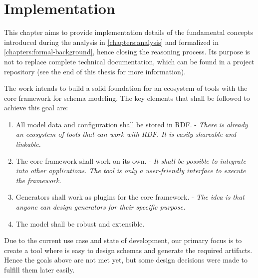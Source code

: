 \chapter{Implementation}\label{chapters:implementation}

This chapter aims to provide implementation details of the fundamental concepts introduced during the analysis in \autoref{chapters:analysis} and formalized in \autoref{chapters:formal-background}, hence closing the reasoning process. Its purpose is not to replace complete technical documentation, which can be found in a project repository (see the end of this thesis for more information).

\bigskip

The work intends to build a solid foundation for an ecosystem of tools with the core framework for schema modeling. The key elements that shall be followed to achieve this goal are:
\begin{enumerate}
    \item All model data and configuration shall be stored in RDF. - \textit{There is already an ecosystem of tools that can work with RDF. It is easily shareable and linkable.}
    \item The core framework shall work on its own. - \textit{It shall be possible to integrate into other applications. The tool is only a user-friendly interface to execute the framework.}
    \item Generators shall work as plugins for the core framework. - \textit{The idea is that anyone can design generators for their specific purpose.}
    \item The model shall be robust and extensible.
\end{enumerate}

Due to the current use case and state of development, our primary focus is to create a tool where is easy to design schemas and generate the required artifacts. Hence the goals above are not met yet, but some design decisions were made to fulfill them later easily.

